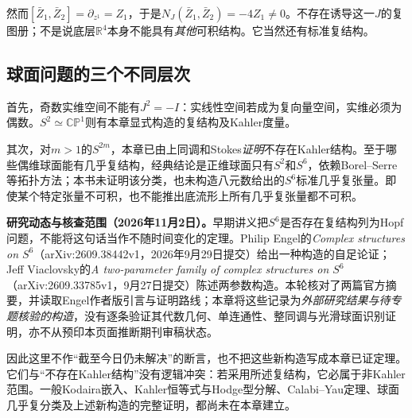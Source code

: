 然而$[\bar Z_1,\bar Z_2]=\partial_{z^1}=Z_1$，于是$N_J(\bar Z_1,\bar Z_2)=-4Z_1\ne0$。不存在诱导这一$J$的复图册；不是说底层$\mathbb R^4$本身不能具有\emph{其他}可积结构。它当然还有标准复结构。

\subsection{球面问题的三个不同层次}
首先，奇数实维空间不能有$J^2=-I$：实线性空间若成为复向量空间，实维必须为偶数。$S^2\simeq\mathbb{CP}^1$则有本章显式构造的复结构及Kahler度量。

其次，对$m>1$的$S^{2m}$，本章已由上同调和Stokes\emph{证明}不存在Kahler结构。至于哪些偶维球面能有几乎复结构，经典结论是正维球面只有$S^2$和$S^6$，依赖Borel--Serre等拓扑方法；本书未证明该分类，也未构造八元数给出的$S^6$标准几乎复张量。即使某个特定张量不可积，也不能推出底流形上所有几乎复张量都不可积。

\textbf{研究动态与核查范围（2026年11月2日）。}早期讲义把$S^6$是否存在复结构列为Hopf问题，不能将这句话当作不随时间变化的定理。Philip Engel的\textit{Complex structures on $S^6$}（arXiv:2609.38442v1，2026年9月29日提交）给出一种构造的自足论证；Jeff Viaclovsky的\textit{A two-parameter family of complex structures on $S^6$}（arXiv:2609.33785v1，9月27日提交）陈述两参数构造。本轮核对了两篇官方摘要，并读取Engel作者版引言与证明路线；本章将这些记录为\emph{外部研究结果与待专题核验的构造}，没有逐条验证其代数几何、单连通性、整同调与光滑球面识别证明，亦不从预印本页面推断期刊审稿状态。

因此这里不作“截至今日仍未解决”的断言，也不把这些新构造写成本章已证定理。它们与“不存在Kahler结构”没有逻辑冲突：若采用所述复结构，它必属于非Kahler范围。一般Kodaira嵌入、Kahler恒等式与Hodge型分解、Calabi--Yau定理、球面几乎复分类及上述新构造的完整证明，都尚未在本章建立。

